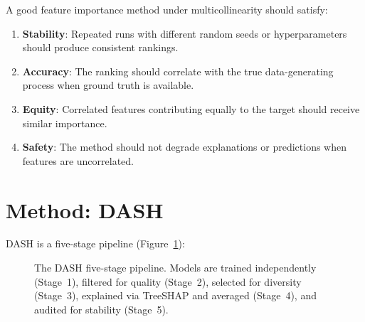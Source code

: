 \documentclass[11pt]{article}
\newcommand{\dash}{\textsc{DASH}}
\begin{document}
A good feature importance method under multicollinearity should satisfy:
\begin{enumerate}
  \item \textbf{Stability}: Repeated runs with different random seeds or
    hyperparameters should produce consistent rankings.
  \item \textbf{Accuracy}: The ranking should correlate with the true
    data-generating process when ground truth is available.
  \item \textbf{Equity}: Correlated features contributing equally to the
    target should receive similar importance.
  \item \textbf{Safety}: The method should not degrade explanations or
    predictions when features are uncorrelated.
\end{enumerate}


\section{Method: DASH}
\label{sec:method}

\dash{} is a five-stage pipeline (Figure~\ref{fig:pipeline}):

\begin{figure}[htbp]
\centering
{}
\caption{The \dash{} five-stage pipeline. Models are trained independently
(Stage~1), filtered for quality (Stage~2), selected for diversity (Stage~3),
explained via TreeSHAP and averaged (Stage~4), and audited for stability
(Stage~5).}
\label{fig:pipeline}
\end{figure}
\end{document}
